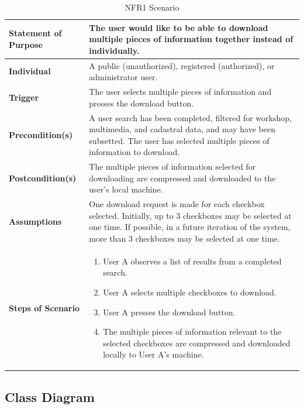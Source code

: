 \documentclass{article}
\begin{document}
\begin{table}[H]
	\caption{NFR1 Scenario}
	\begin{tabularx}{\textwidth}{|l|X|}
		\hline
		\textbf{Statement of Purpose} & The user would like to be able to download multiple pieces of information together instead of individually.         \\ \hline
		\textbf{Individual} & A public (unauthorized), registered (authorized), or administrator user. \\ \hline
		\textbf{Trigger}  & The user selects multiple pieces of information and presses the download button.            \\ \hline
		\textbf{Precondition(s)}  & A user search has been completed, filtered for 
			workshop, multimedia, and cadastral data, and may have been subsetted. The user has selected multiple pieces of information to download. \\ \hline
		\textbf{Postcondition(s)}  & The multiple pieces of information selected for downloading are compressed and downloaded to the user's local machine. \\ \hline
		\textbf{Assumptions} & One download request is made for each 
			checkbox selected. Initially, up to 3 checkboxes may be selected at one time. If possible, in a future iteration of the system, more than 3 checkboxes may be selected at one time. \\ \hline
		\textbf{Steps of Scenario} & 
		\begin{enumerate}
				\item User A observes a list of results from a completed search.
				\item User A selects multiple checkboxes to download.
				\item User A presses the download button.
				\item The multiple pieces of information relevant to the selected checkboxes are compressed and downloaded locally to User A's machine.
			\end{enumerate}  \\  \hline
	\end{tabularx}
\end{table}

\clearpage

\subsection{Class Diagram}
\end{document}
